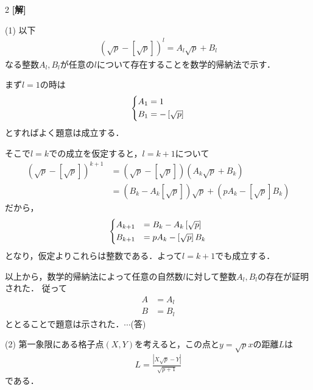 \documentclass[../../../../main.tex]{subfiles}
\begin{document}
\setcounter{equation}{0}
\begin{oframed}
  
\end{oframed}
\setlength{\columnseprule}{0.4pt}
\begin{multicols}{2}
  {\bf[解]}

  (1)
  以下
  \begin{align}
    \left(\sqrt{p} - \left[\sqrt{p}\right]\right)^{l} = A_{l}\sqrt{p} + B_{l} \label{2003-2:eq:1}
  \end{align}
  なる整数$A_{l},B_{l}$が任意の$l$について存在することを数学的帰納法で示す．

  まず$l=1$の時は
  \begin{align}
    \begin{dcases}
      A_1 = 1 \\
      B_1 = -\left[\sqrt{p}\right]
    \end{dcases} \label{2003-2:eq:2}
  \end{align}
  とすればよく題意は成立する．

  そこで$l=k$での成立を仮定すると，$l=k+1$について
  \begin{align*}
    \left(\sqrt{p} - \left[\sqrt{p}\right]\right)^{k+1}
     & = \left(\sqrt{p} - \left[\sqrt{p}\right]\right)\left(A_{k}\sqrt{p} + B_{k}\right)                    \\
     & = \left(B_{k}-A_{k}\left[\sqrt{p}\right]\right)\sqrt{p}+\left(pA_k-\left[\sqrt{p}\right]B_{k}\right)
  \end{align*}
  だから，
  \begin{align}
    \begin{dcases}
      A_{k+1} & = B_{k}-A_{k}\left[\sqrt{p}\right] \\
      B_{k+1} & = pA_k-\left[\sqrt{p}\right]B_{k}
    \end{dcases} \label{2003-2:eq:3}
  \end{align}
  となり，仮定よりこれらは整数である．よって$l=k+1$でも成立する．

  以上から，数学的帰納法によって任意の自然数$l$に対して整数$A_{l},B_{l}$の存在が証明された．
  従って
  \begin{align*}
    A & = A_{l} \\
    B & = B_{l}
  \end{align*}
  ととることで題意は示された．$\cdots$(答)

  \vspace{10pt}
  (2)
  第一象限にある格子点$(X,Y)$を考えると，この点と$y=\sqrt{p}x$の距離$L$は
  \begin{align}
    L=\frac{\left|X\sqrt{p}-Y\right|}{\sqrt{p+1}}\label{2003-2:eq:4}
  \end{align}
  である．


\end{multicols}
\end{document}
